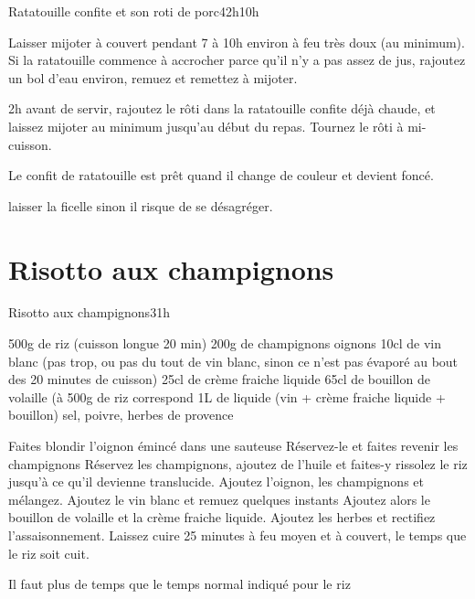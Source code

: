 {\begin{recette}{Ratatouille confite et son roti de porc}{4}{2h}{10h}
\begin{cuisson}
Laisser mijoter à couvert pendant 7 à 10h environ à feu très doux (au minimum). Si la ratatouille commence à accrocher parce 
qu'il n'y a pas assez de jus, rajoutez un bol d'eau environ, remuez et remettez à mijoter.

2h avant de servir, rajoutez le rôti dans la ratatouille confite déjà chaude, et laissez mijoter au minimum jusqu'au début du 
repas. Tournez le rôti à mi-cuisson.

Le confit de ratatouille est prêt quand il change de couleur et devient foncé. 

laisser la ficelle sinon il risque de se désagréger.
\end{cuisson}
\end{recette}

\section{Risotto aux champignons}
\begin{recette}{Risotto aux champignons}{3}{1h}{}
\begin{ingredients}
\ingredient 500g de riz (cuisson longue 20 min)
\ingredient 200g de champignons
 oignons
\ingredient 10cl de vin blanc (pas trop, ou pas du tout de vin blanc, sinon ce n'est pas évaporé au bout des 20 minutes de 
cuisson)
\ingredient 25cl de crème fraiche liquide
\ingredient 65cl de bouillon de volaille (à 500g de riz correspond 1L de liquide (vin + crème fraiche liquide + bouillon)
\ingredient sel, poivre, herbes de provence
\end{ingredients}

\begin{preparation}
\etape Faites blondir l'oignon émincé dans une sauteuse
\etape Réservez-le et faites revenir les champignons
\etape Réservez les champignons, ajoutez de l'huile et faites-y rissolez le riz jusqu'à ce qu'il devienne translucide.
\etape Ajoutez l'oignon, les champignons et mélangez.
\etape Ajoutez le vin blanc et remuez quelques instants 
\etape Ajoutez alors le bouillon de volaille et la crème fraiche liquide. 
\etape Ajoutez les herbes et rectifiez l'assaisonnement.
\etape Laissez cuire 25 minutes à feu moyen et à couvert, le temps que le riz soit cuit. 
\begin{remarque}
Il faut plus de temps que le temps normal indiqué pour le riz
\end{remarque}
\end{preparation}


\end{recette}}

